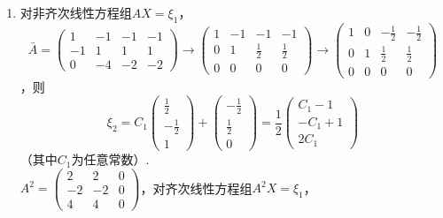 \documentclass[12pt,fontset=fandol]{ctexart}
\begin{document}
\begin{solve}
\begin{enumerate}
                \item 对非齐次线性方程组$AX=\xi_1$，\\
                      
\[\bar{A}=\begin{pmatrix}
                              1  & -1 & -1 & -1 \\
                              -1 & 1  & 1  & 1  \\
                              0  & -4 & -2 & -2
                          \end{pmatrix}
                          \rightarrow\begin{pmatrix}
                              1 & -1 & -1       & -1       \\
                              0 & 1  & \frac 12 & \frac 12 \\
                              0 & 0  & 0        & 0
                          \end{pmatrix}
                          \rightarrow\begin{pmatrix}
                              1 & 0 & -\frac 12 & -\frac 12 \\
                              0 & 1 & \frac 12  & \frac 12  \\
                              0 & 0 & 0         & 0
                          \end{pmatrix}\]
，则\\
                      
\[\xi_2=C_1\begin{pmatrix}
                              \frac 12  \\
                              -\frac 12 \\
                              1
                          \end{pmatrix} + \begin{pmatrix}
                              -\frac 12 \\
                              \frac 12  \\
                              0
                          \end{pmatrix}=\dfrac 12\begin{pmatrix}
                              C_1 - 1  \\
                              -C_1 + 1 \\
                              2C_1
                          \end{pmatrix}\]
（其中$C_1$为任意常数）.\\
                      $A^2=\begin{pmatrix}
                              2  & 2  & 0 \\
                              -2 & -2 & 0 \\
                              4  & 4  & 0
                          \end{pmatrix}$，对齐次线性方程组$A^2X=\xi_1$，\\
                      

\end{enumerate}
\end{solve}
\end{document}
